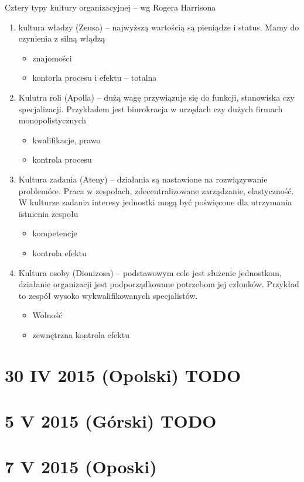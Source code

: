 \documentclass[a4paper,10pt]{report}
\begin{document}
\noindent Cztery typy kultury organizacyjnej -- wg Rogera Harrisona
\begin{enumerate}
	\item kultura władzy (Zeusa) -- najwyższą wartością są pieniądze i status. Mamy do czynienia z silną włądzą
	\begin{itemize}
		\item znajomości
		\item kontorla procesu i efektu -- totalna
	\end{itemize}
	\item Kulutra roli (Apolla) -- dużą wagę przywiązuje się do funkcji, stanowiska czy specjalizacji. Przykładem jest biurokracja w urzędach czy dużych firmach monopolistycznych
	\begin{itemize}
		\item kwalifikacje, prawo
		\item kontrola procesu
	\end{itemize}
	\item Kultura zadania (Ateny) -- działania są nastawione na rozwiązywanie problemóœ. Praca w zespołach, zdecentralizowane zarządzanie, elastyczność. W kulturze zadania interesy jednostki mogą być poświęcone dla utrzymania istnienia zespołu
	\begin{itemize}
		\item kompetencje
		\item kontrola efektu
	\end{itemize}
	\item Kultura osoby (Dionizosa) -- podstawowym cele jest służenie jednostkom, działanie organizacji jest podporządkowane potrzebom jej członków. Przykład to zespół wysoko wykwalifikowanych specjalistów.
	\begin{itemize}
		\item Wolność
		\item zewnętrzna kontrola efektu
	\end{itemize}
\end{enumerate}

\section{30 IV 2015 (Opolski) TODO}
\section{5 V 2015 (Górski) TODO}

\section{7 V 2015 (Oposki)}
\end{document}
